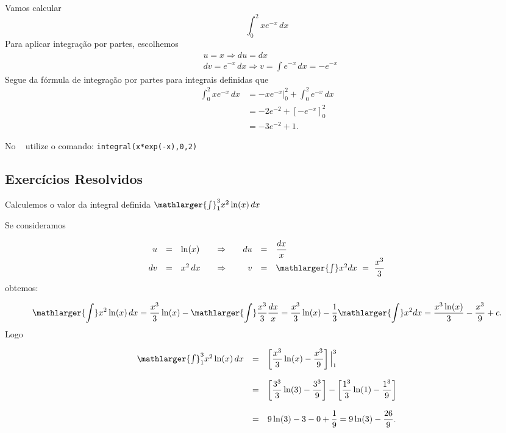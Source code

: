 \cleardoublepage\documentclass[../main.tex]{subfiles}
\begin{document}
\begin{ex}
  Vamos calcular
  \begin{equation*}
    \int_0^2 xe^{-x}\,dx
  \end{equation*}
  Para aplicar integração por partes, escolhemos
  \begin{align*}
    & u = x \Rightarrow du = dx \\
    & dv = e^{-x}\,dx \Rightarrow v = \int e^{-x}\,dx = -e^{-x}
  \end{align*}
  Segue da fórmula de integração por partes para integrais definidas que
  \begin{align*}
    \int_0^2 xe^{-x}\,dx &= \left. -xe^{-x}\right|_0^2 + \int_0^2 e^{-x}\,dx \\
                         &= -2e^{-2} + \left[-e^{-x}\right]_0^2 \\
                         &= -3e^{-2} + 1.
  \end{align*}

    No \geogebra~ utilize o comando:    \verb|integral(x*exp(-x),0,2)|
    \end{ex}
\subsection{Exercícios Resolvidos}
\begin{exeresol}
  Calculemos o valor da integral definida \(\mathlarger{\int}^{3}_{1} x^2 \ln(x)\,dx \)

\begin{solution}
Se consideramos

\[ \begin{array}{rclcrcl} u &=& \ln (x)&\quad\Rightarrow\quad& du &=& \dfrac{dx}{x}\\ dv &=& x^2\,dx &\quad\Rightarrow\quad& v &=& \mathlarger{\int}x^{2} dx \,\, =\,\,\dfrac{x^3}{3} \end{array} \]
obtemos:

\[ \mathlarger{\int}x^2\ln(x)\,dx=\dfrac{x^3}{3}\ln(x)- \mathlarger{\int} \dfrac{x^3}{3} \dfrac{dx}{x} =\dfrac{x^3}{3}\ln(x)- \dfrac{1}{3}\mathlarger{\int} x^2 dx =\dfrac{x^3 \ln(x)}{3}- \dfrac{x^3}{9}+c. \]
Logo

\[ \begin{array}{rclcr} \mathlarger{\int}^{3}_{1}x^2\ln(x)\,dx&=&\left[\dfrac{x^3}{3}\ln(x)- \dfrac{x^3}{9}\right]\Big{|}^{3}_{1}\\ \\ &=&\left[\dfrac{3^3}{3}\ln(3)- \dfrac{3^3}{9}\right]- \left[\dfrac{1^3}{3}\ln(1)- \dfrac{1^3}{9}\right] \\\\ &=&9\ln(3)- 3- 0+ \dfrac{1}{9}= 9\ln(3)-\dfrac{26}{9}. \end{array} \]
\end{solution}


\end{exeresol}
\end{document}
